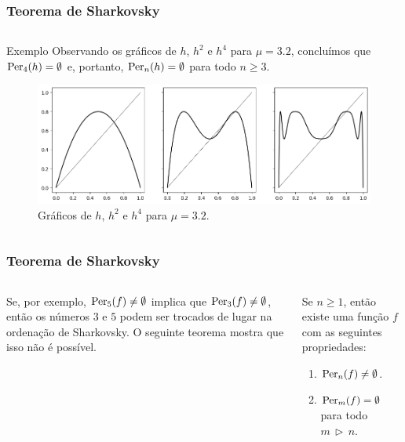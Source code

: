 
\begin{frame}
\vspace{5pt}
\frametitle{Teorema de Sharkovsky}
\begin{columns}
\column{\dimexpr\paperwidth-15pt}

\begin{block}{Exemplo}
Observando os gráficos de $h$, $h^2$ e $h^4$ para $\mu = 3.2$, concluímos que $\operatorname{Per}_4(h) = \emptyset$ e, portanto, $\operatorname{Per}_n(h) = \emptyset$ para todo $n \geq 3$.

\vspace{5pt}

\begin{figure}[!htb]
\centering
\includegraphics[scale=0.4]{images/h_3,2.png}
\caption{Gráficos de $h$, $h^2$ e $h^4$ para $\mu = 3.2$.}
\end{figure}
\end{block}

\end{columns}
\end{frame}


\begin{frame}
\vspace{5pt}
\frametitle{Teorema de Sharkovsky}
\begin{columns}
\column{\dimexpr\paperwidth-15pt}

Se, por exemplo, $\operatorname{Per}_5(f) \neq \emptyset$ implica que $\operatorname{Per}_3(f) \neq \emptyset$, então os números $3$ e $5$ podem ser trocados de lugar na ordenação de Sharkovsky. O seguinte teorema mostra que isso não é possível.

\begin{theorem}
Se $n \geq 1$, então existe uma função $f$ com as seguintes propriedades:
\begin{enumerate}
\item $\operatorname{Per}_n(f) \neq \emptyset$.
\item $\operatorname{Per}_m(f) =  \emptyset$ para todo $m \, \triangleright \, n$.
\end{enumerate}
\end{theorem}

\end{columns}
\end{frame}
